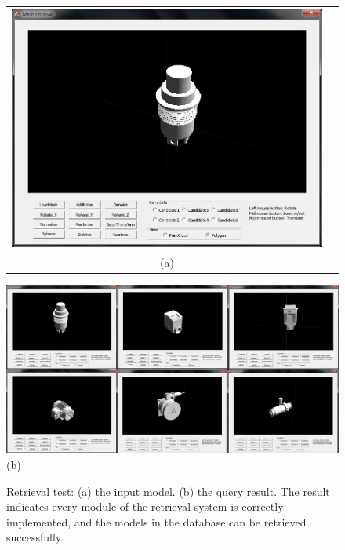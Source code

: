 \begin{figure}
\begin{center}
\begin{tabular}{cc}   %
   \includegraphics[width=0.6\linewidth]{input_initialdesign}  \\
   (a)\\
\end{tabular}
   \includegraphics[width=1\linewidth]{output_finaldesign}  \\
   (b)\\
\caption{Retrieval test: (a) the input model. (b) the query result. The result indicates every module of the retrieval system is correctly implemented, and the models in the database can be retrieved successfully.} 
  \label{retrievaltest_UI}
\end{center}
\end{figure}

